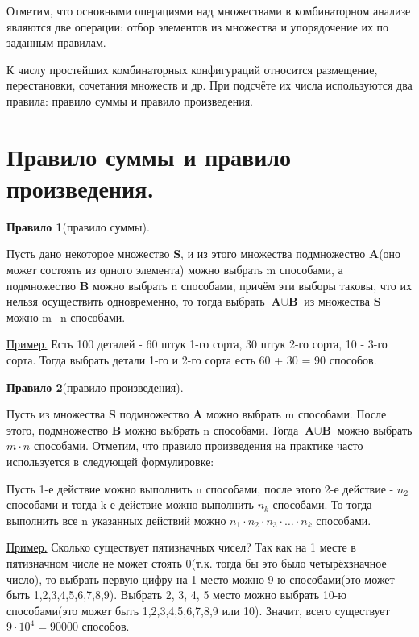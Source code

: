 \documentclass[12pt, a4paper, oneside]{article}
\theoremstyle{plain} %
\theoremstyle{definition}
\newcommand{\indef}[1]{\textbf{ \color{dark_red} #1}}
\begin{document}
Отметим, что основными операциями над множествами в комбинаторном анализе являются две операции: отбор элементов из множества и упорядочение их по заданным правилам.\par 
К числу простейших комбинаторных конфигураций относится размещение, перестановки, сочетания множеств и др. При подсчёте их числа используются два правила: правило суммы и правило произведения.

\section{Правило суммы и правило произведения.}


\indef{Правило 1}(правило суммы).\par
Пусть дано некоторое множество \textbf{S}, и из этого множества подмножество \textbf{A}(оно может состоять из одного элемента) можно выбрать m способами, а подмножество \textbf{B} можно выбрать n способами, причём эти выборы таковы, что их нельзя осуществить одновременно, то тогда выбрать $\textbf{A} \cup \textbf{B}$ из множества \textbf{S} можно m+n способами.\par 

\underline{Пример.} Есть 100 деталей - 60 штук 1-го сорта, 30 штук 2-го сорта, 10 - 3-го сорта. Тогда выбрать детали 1-го и 2-го сорта есть 60 + 30 = 90 способов.

\indef{Правило 2}(правило произведения). \par 
Пусть из множества \textbf{S} подмножество \textbf{A} можно выбрать m способами. После этого, подмножество \textbf{B} можно выбрать n способами. Тогда $\textbf{A} \cup \textbf{B}$ можно выбрать $m \cdot n$ способами. Отметим, что правило произведения на практике часто используется в следующей формулировке: \par 

Пусть 1-е действие можно выполнить n способами, после этого 2-е действие - $n_2$ способами и тогда k-е действие можно выполнить $n_k$ способами. То тогда выполнить все n указанных действий можно $n_1 \cdot n_2 \cdot n_3 \cdot \dots \cdot n_k$ способами. \par 

\underline{Пример.} Сколько существует пятизначных чисел? 
Так как на 1 месте в пятизначном числе не может стоять 0(т.к. тогда бы это было четырёхзначное число), то выбрать первую цифру на 1 место можно 9-ю способами(это может быть 1,2,3,4,5,6,7,8,9). Выбрать 2, 3, 4, 5 место можно выбрать 10-ю способами(это может быть 1,2,3,4,5,6,7,8,9 или 10). Значит, всего существует $9 \cdot 10^4 = 90000$ способов.
\end{document}
